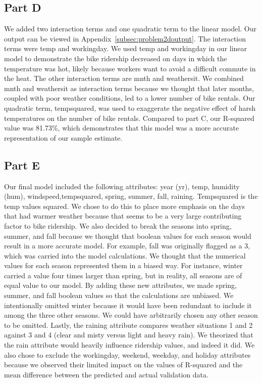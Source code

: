 \documentclass[11pt]{article}
\begin{document}
\subsection{Part D}
\label{subsec:2d}
We added two interaction terms and one quadratic term to the linear model. Our output can be viewed in Appendix~\ref{subsec:problem2doutput}. The interaction terms were temp and workingday. We used temp and workingday in our linear model to demonstrate the bike ridership decreased on days in which the temperature was hot, likely because workers want to avoid a difficult commute in the heat. The other interaction terms are  mnth and weathersit. We combined mnth and weathersit as interaction terms because we thought that later months, coupled with poor weather conditions, led to a lower number of bike rentals. Our quadratic term, tempsquared, was used to exaggerate the negative effect of harsh temperatures on the number of bike rentals. Compared to part C, our R-squared value was 81.73\%, which demonstrates that this model was a more accurate representation of our sample estimate. 

\subsection{Part E}
\label{subsec:2e}
Our final model included the following attributes: year (yr), temp, humidity (hum), windspeed,tempsquared, spring, summer, fall, raining. Tempsquared is the temp values squared. We chose to do this to place more emphasis on the days that had warmer weather because that seems to be a very large contributing factor to bike ridership. We also decided to break the seasons into spring, summer, and fall because we thought that boolean values for each season would result in a more accurate model. For example, fall was originally flagged as a 3, which was carried into the model calculations. We thought that the numerical values for each season represented them in a biased way. For instance, winter carried a value four times larger than spring, but in reality, all seasons are of equal value to our model. By adding these new attributes, we made spring, summer, and fall boolean values so that the calculations are unbiased. We intentionally omitted winter because it would have been redundant to include it among the three other seasons. We could have arbitrarily chosen any other season to be omitted. Lastly, the raining attribute compares weather situations 1 and 2 against 3 and 4 (clear and misty versus light and heavy rain). We theorized that the rain attribute would heavily influence ridership values, and indeed it did. We also chose to exclude the workingday, weekend, weekday, and holiday attributes because we observed their limited impact on the values of R-squared and the mean difference between the predicted and actual validation data. 
\end{document}
